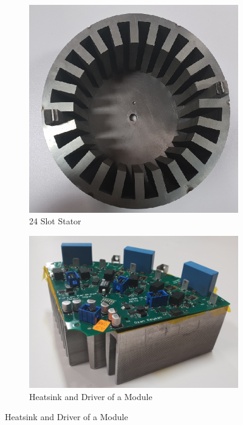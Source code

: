 \documentclass[a4paper,11pt]{article}
\begin{document}
\begin{figure}[ht!]
\begin{subfigure}[b]{0.33\textwidth}
    \centering
    \includegraphics[width=\linewidth]{stator.png}
    \caption{24 Slot Stator}
    \label{fig:4phmmf}    
\end{subfigure}
\begin{subfigure}[b]{0.33\textwidth}
    \centering
    \includegraphics[width=\linewidth]{heatsink.png}
    \caption{Heatsink and Driver of a Module}

\end{subfigure}
\end{figure}
\end{document}

